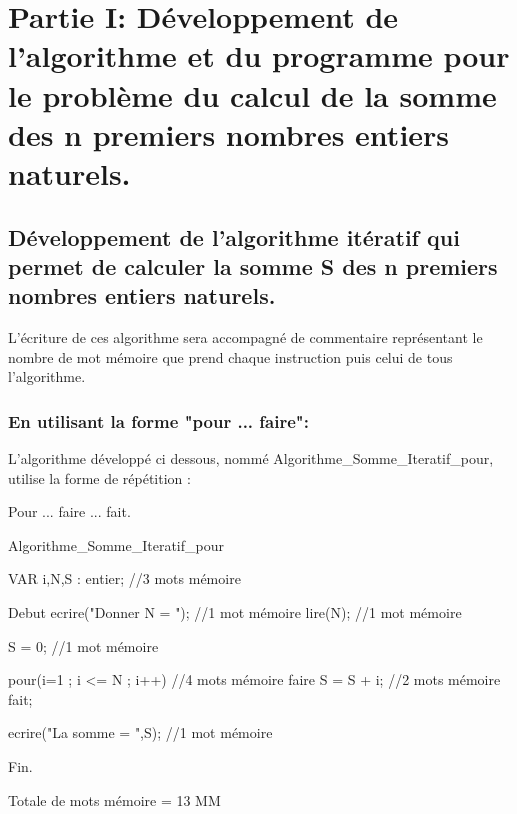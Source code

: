 \documentclass[•]{article}
\begin{document}
\def\reportnumber{1}
\def\reporttitle{Mesure du temps d'exécution d'un programme.}


\section{Partie I: Développement de l'algorithme et du programme pour le problème du calcul de la somme des n premiers nombres entiers naturels.}

\subsection{Développement de l'algorithme itératif qui permet de calculer la somme S des n premiers nombres entiers naturels.}
\textrm{L'écriture de ces algorithme sera accompagné de commentaire représentant le nombre de mot mémoire que prend chaque instruction puis celui de tous l'algorithme.}

\subsubsection{En utilisant la forme "pour ... faire":}
L'algorithme développé ci dessous, nommé Algorithme\_Somme\_Iteratif\_pour, utilise la forme de répétition : 

Pour ... faire ... fait.
\begin{sql}

 Algorithme_Somme_Iteratif_pour
 
 VAR
 i,N,S : entier;				//3 mots mémoire
 
 Debut
	ecrire("Donner N = ");		//1 mot mémoire
	lire(N);					//1 mot mémoire
	
	S = 0;						//1 mot mémoire
	
	pour(i=1 ; i <= N ; i++)	//4 mots mémoire
	  faire
		S = S + i;				//2 mots mémoire
	  fait;
	  
	ecrire("La somme = ",S);	//1 mot mémoire
	
 Fin.
\end{sql}
\textrm{Totale de mots mémoire = 13 MM}
\end{document}
